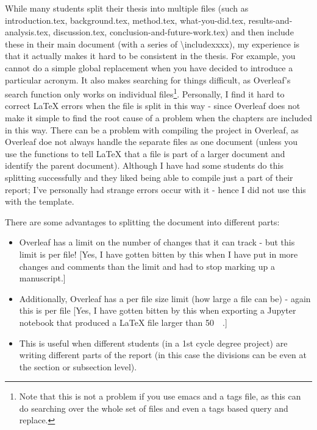 \documentclass[examplethesis.tex]{subfiles}
\begin{document}
While many students split their thesis into multiple files (such as introduction.tex, background.tex, method.tex, what-you-did.tex, results-and-analysis.tex, discussion.tex, conclusion-and-future-work.tex) and then include these in their main document (with a series of \textbackslash include{xxxx}), my experience is that it actually makes it hard to be consistent in the thesis. For example, you cannot do a simple global replacement when you have decided to introduce a particular acronym. It also makes searching for things difficult, as Overleaf's search function only works on individual files\footnote{Note that this is not a problem if you use emacs and a tags file, as this can do searching over the whole set of files and even a tags based query and replace.}. Personally, I find it hard to correct LaTeX errors when the file is split in this way - since Overleaf does not make it simple to find the root cause of a problem when the chapters are included in this way. There can be a problem with compiling the project in Overleaf, as Overleaf doe not always handle the separate files as one document (unless you use the functions to tell LaTeX that a file is part of a larger document and identify the parent document). Although I have had some students do this splitting successfully and they liked being able to compile just a part of their report; I've personally had strange errors occur with it - hence I did not use this with the template.


There are some advantages to splitting the document into different parts:
\begin{itemize}
\item    Overleaf has a limit on the number of changes that it can track - but this limit is per file!  [Yes, I have gotten bitten by this when I have put in more changes and comments than the limit and had to stop marking up  a manuscript.]

\item    Additionally, Overleaf has a per file size limit (\ie how large a file can be) - again this is per file [Yes, I have gotten bitten by this when exporting a Jupyter notebook that produced a LaTeX file larger than \SI{50}{\mega\byte}.]

\item    This is useful when different students (in a 1st cycle degree project) are writing different parts of the report (in this case the divisions can be even at the section or subsection level).
\end{itemize}
\end{document}
